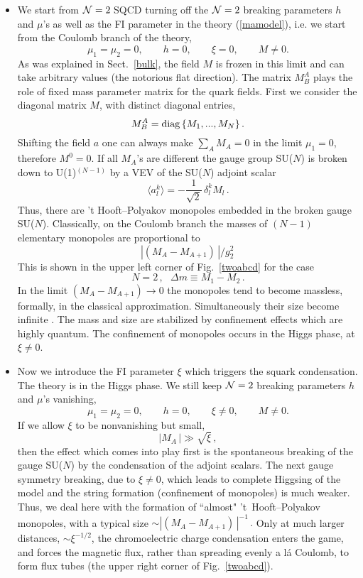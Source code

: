 \documentclass[epsfig,12pt]{article}
\def\beq{\begin{equation}}
\def\eeq{\end{equation}}
\newcommand{\ntwo}{${\cal N}=2\;$}
\begin{document}
\begin{itemize}

\item
We start from \ntwo SQCD turning off the \ntwo breaking parameters $h$ and $\mu$'s
as well as the FI parameter in the theory (\ref{mamodel}), i.e. we start from the Coulomb
branch of the theory,
\beq
\mu_1=\mu_2=0,\qquad h=0, \qquad \xi=0, \qquad M\neq 0.
\label{stage1}
\eeq
As was explained in Sect.~\ref{bulk}, the field $M$
is frozen in this limit and can take arbitrary values (the notorious flat direction). 
The matrix  $M^A_B$ plays the role of fixed mass parameter matrix for
the quark fields.
First we  consider the diagonal matrix $M$, with distinct diagonal entries,
\beq
M^A_B ={\rm diag}\,\{M_1,...,M_N\}\,.
\label{diffmasses}
\eeq
Shifting the field $a$ one can always make $\sum_{A}M_A=0$ in the limit $\mu_1=0$,
therefore $M^0=0$. If all $M_A$'s are different the gauge group SU($N$) is broken down to U(1)$^{(N-1)}$ by a VEV of the SU($N$) adjoint scalar 
\beq
\langle a^k_l\rangle = -\frac{1}{\sqrt{2}} \,\delta^k_l  M_l  \,. 
\label{adjvev}
\eeq
Thus, there are 't Hooft--Polyakov monopoles embedded in the broken gauge SU($N$).
Classically, on the Coulomb branch
the masses of $(N-1)$ elementary monopoles are proportional to 
$$|(M_A-M_{A+1}) \,| /g_2^2\, $$
This is shown in the  upper left corner of Fig.~\ref{twoabcd}
for the case $$N=2\,,\,\,\,\, \Delta m\equiv M_1-M_2\,.$$
In  the limit $(M_A-M_{A+1})\to 0$ the monopoles tend to
become massless, formally, in the classical
approximation. Simultaneously their size become infinite \cite{We}.
The mass and size are stabilized by confinement effects
which are highly quantum. The confinement of monopoles occurs
in  the Higgs phase, at $\xi\neq 0$.

\item 

Now we introduce the FI parameter $\xi$ which triggers the squark condensation. The 
theory is in the Higgs phase. We still keep \ntwo breaking parameters $h$ and $\mu$'s
vanishing,
\beq
\mu_1=\mu_2=0,\qquad h=0, \qquad \xi\neq 0, \qquad M\neq 0.
\label{stage2}
\eeq
If we allow $\xi$ to be nonvanishing but small,
\beq
|M_A \,|  \gg\sqrt{\xi}\,,
\eeq
then the effect which comes into play first is the 
spontaneous breaking of the   gauge SU($N$) by the condensation of 
the adjoint scalars.
The next gauge symmetry breaking, due to $\xi\neq 0$,
which leads to complete Higgsing of the model and the string
formation (confinement of monopoles) is much weaker.
Thus,  we deal here with  the formation
of ``almost"  't~Hooft--Polyakov monopoles, with a typical size
$\sim \left|(M_A-M_{A+1}) \,\right| ^{-1}\,.$ Only at much larger distances,
$\sim \xi ^{-1/2}$, the chromoelectric charge condensation enters the game,
and forces the magnetic flux, rather than spreading evenly a l\'a
Coulomb, to form flux tubes (the  upper right corner of Fig.~\ref{twoabcd}). 



\end{itemize}
\end{document}
